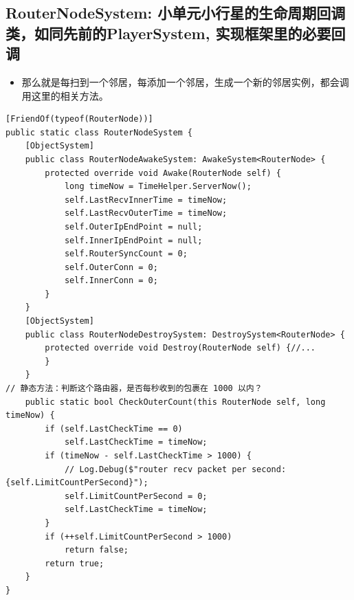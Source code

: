 \documentclass[9pt, b5paper]{article}
\begin{document}
\subsection{RouterNodeSystem: 小单元小行星的生命周期回调类，如同先前的PlayerSystem, 实现框架里的必要回调}
\label{sec-7-27}
\begin{itemize}
\item 那么就是每扫到一个邻居，每添加一个邻居，生成一个新的邻居实例，都会调用这里的相关方法。
\end{itemize}
\begin{verbatim}
[FriendOf(typeof(RouterNode))]
public static class RouterNodeSystem {
    [ObjectSystem]
    public class RouterNodeAwakeSystem: AwakeSystem<RouterNode> {
        protected override void Awake(RouterNode self) {
            long timeNow = TimeHelper.ServerNow();
            self.LastRecvInnerTime = timeNow;
            self.LastRecvOuterTime = timeNow;
            self.OuterIpEndPoint = null;
            self.InnerIpEndPoint = null;
            self.RouterSyncCount = 0;
            self.OuterConn = 0;
            self.InnerConn = 0;
        }
    }
    [ObjectSystem]
    public class RouterNodeDestroySystem: DestroySystem<RouterNode> {
        protected override void Destroy(RouterNode self) {//...
        }
    }
// 静态方法：判断这个路由器，是否每秒收到的包裹在 1000 以内？
    public static bool CheckOuterCount(this RouterNode self, long timeNow) {
        if (self.LastCheckTime == 0) 
            self.LastCheckTime = timeNow;
        if (timeNow - self.LastCheckTime > 1000) {
            // Log.Debug($"router recv packet per second: {self.LimitCountPerSecond}");
            self.LimitCountPerSecond = 0;
            self.LastCheckTime = timeNow;
        }
        if (++self.LimitCountPerSecond > 1000) 
            return false;
        return true;
    }
}
\end{verbatim}
\end{document}
